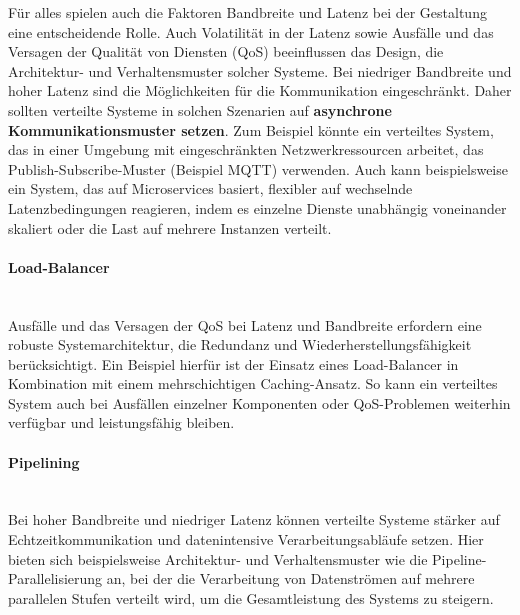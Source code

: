 \documentclass[../vs-script-first-v01.tex]{subfiles}
\begin{document}
Für alles spielen auch die Faktoren Bandbreite und Latenz bei der Gestaltung eine entscheidende Rolle. Auch Volatilität in der Latenz sowie Ausfälle und das Versagen der Qualität von Diensten (QoS) beeinflussen das Design, die Architektur- und Verhaltensmuster solcher Systeme. Bei niedriger Bandbreite und hoher Latenz sind die Möglichkeiten für die Kommunikation eingeschränkt. Daher sollten verteilte Systeme in solchen Szenarien auf \textbf{asynchrone Kommunikationsmuster setzen}. Zum Beispiel könnte ein verteiltes System, das in einer Umgebung mit eingeschränkten Netzwerkressourcen arbeitet, das Publish-Subscribe-Muster (Beispiel MQTT) verwenden. Auch kann beispielsweise ein System, das auf Microservices basiert, flexibler auf wechselnde Latenzbedingungen reagieren, indem es einzelne Dienste unabhängig voneinander skaliert oder die Last auf mehrere Instanzen verteilt.
\paragraph{Load-Balancer \\\\}
Ausfälle und das Versagen der QoS bei Latenz und Bandbreite erfordern eine robuste Systemarchitektur, die Redundanz und Wiederherstellungsfähigkeit berücksichtigt. Ein Beispiel hierfür ist der Einsatz eines Load-Balancer in Kombination mit einem mehrschichtigen Caching-Ansatz. So kann ein verteiltes System auch bei Ausfällen einzelner Komponenten oder QoS-Problemen weiterhin verfügbar und leistungsfähig bleiben.
\paragraph{Pipelining \\\\}
Bei hoher Bandbreite und niedriger Latenz können verteilte Systeme stärker auf Echtzeitkommunikation und datenintensive Verarbeitungsabläufe setzen. Hier bieten sich beispielsweise Architektur- und Verhaltensmuster wie die Pipeline-Parallelisierung an, bei der die Verarbeitung von Datenströmen auf mehrere parallelen Stufen verteilt wird, um die Gesamtleistung des Systems zu steigern.
\end{document}
